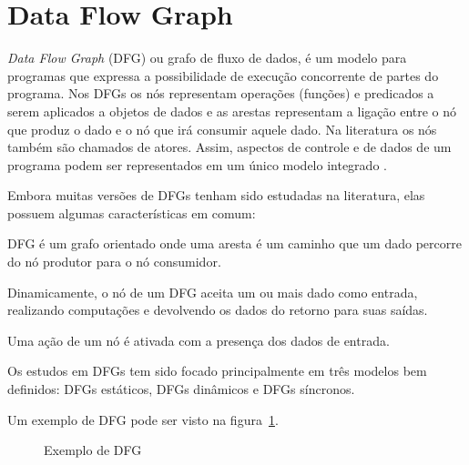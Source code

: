 
\section{Data Flow Graph}

\textit{Data Flow Graph} (DFG) ou grafo de fluxo de dados, é um modelo para 
programas que expressa a possibilidade de execução concorrente de partes do
programa. 
Nos DFGs os nós representam operações (funções) e predicados a serem
aplicados a objetos de dados e as arestas representam a ligação entre o nó que
produz o dado e o nó que irá consumir aquele dado.
Na literatura os nós também são chamados de atores.
Assim, aspectos de controle e de dados de um programa podem ser representados 
em um único modelo integrado \cite{eopc}.

Embora muitas versões de DFGs tenham sido estudadas na literatura, elas possuem 
algumas características em comum:

\begin{alineas}
        \item DFG é um grafo orientado onde uma aresta é um caminho que um dado
        percorre do nó produtor para o nó consumidor.
        \item Dinamicamente, o nó de um DFG aceita um ou mais dado como entrada,
        realizando computações e devolvendo os dados do retorno para suas
        saídas.
        \item Uma ação de um nó é ativada com a presença dos dados de entrada.
\end{alineas}

Os estudos em DFGs tem sido focado principalmente em três modelos bem definidos:
DFGs estáticos, DFGs dinâmicos e DFGs síncronos.

Um exemplo de DFG pode ser visto na figura~\ref{dfg_ex}.

\begin{figure}
\centering
\label{dfg_ex}
\caption{Exemplo de DFG}
\end{figure}




